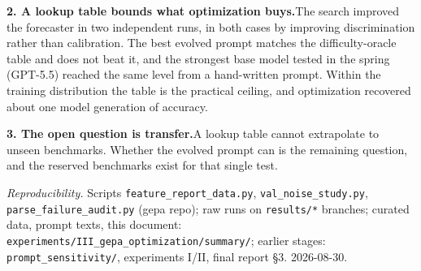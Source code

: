 \documentclass[10pt]{article}
\newcommand{\thepar}[1]{\vspace{2.5pt}\textbf{#1}\hspace{0.7em}}
\begin{document}
\thepar{2. A lookup table bounds what optimization buys.}The search improved the forecaster in two independent runs, in both cases by improving discrimination rather than calibration. The best evolved prompt matches the difficulty-oracle table and does not beat it, and the strongest base model tested in the spring (GPT-5.5) reached the same level from a hand-written prompt. Within the training distribution the table is the practical ceiling, and optimization recovered about one model generation of accuracy.

\thepar{3. The open question is transfer.}A lookup table cannot extrapolate to unseen benchmarks. Whether the evolved prompt can is the remaining question, and the reserved benchmarks exist for that single test.

\vspace{1.5mm}
{\scriptsize\raggedright\emph{Reproducibility.} Scripts \texttt{feature\_report\_data.py}, \texttt{val\_noise\_study.py}, \texttt{parse\_failure\_audit.py} (gepa repo); raw runs on \texttt{results/*} branches; curated data, prompt texts, this document: \texttt{experiments/III\_gepa\_optimization/summary/}; earlier stages: \texttt{prompt\_sensitivity/}, experiments I/II, final report \S3. 2026-08-30.\par}
\end{document}
